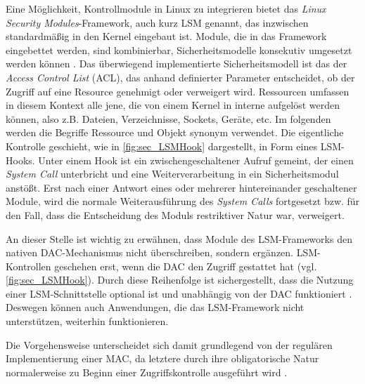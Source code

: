 \documentclass[../main.tex]{subfiles}
\begin{document}
			Eine Möglichkeit, Kontrollmodule in Linux zu integrieren bietet das \emph{Linux Security Modules}-Framework, auch kurz \acrshort{LSM} genannt, das inzwischen standardmäßig in den Kernel eingebaut ist.
			Module, die in das Framework eingebettet werden, sind kombinierbar, Sicherheitsmodelle konsekutiv umgesetzt werden können \cite[S.3]{LSMFramework}.
			Das überwiegend implementierte Sicherheitsmodell ist das der \emph{Access Control List} (\acrshort{ACL}), das anhand definierter Parameter entscheidet, ob der Zugriff auf eine Resource genehmigt oder verweigert wird. Ressourcen umfassen in diesem Kontext alle jene, die von einem Kernel in interne  aufgelöst werden können, also z.B. Dateien, Verzeichnisse, Sockets, Geräte, etc. Im folgenden werden die Begriffe Ressource und Objekt synonym verwendet.
			Die eigentliche Kontrolle geschieht, wie in \fig \ref{fig:sec_LSMHook} dargestellt, in Form eines LSM-Hooks. Unter einem Hook ist ein zwischengeschaltener Aufruf gemeint, der einen \emph{System Call} unterbricht und eine Weiterverarbeitung in ein Sicherheitsmodul anstößt. Erst nach einer Antwort eines oder mehrerer hintereinander geschaltener Module, wird die normale Weiterausführung des \emph{System Calls} fortgesetzt bzw. für den Fall, dass die Entscheidung des Moduls restriktiver Natur war, verweigert.

			An dieser Stelle ist wichtig zu erwähnen, dass Module des LSM-Frameworks den nativen DAC-Mechanismus nicht überschreiben, sondern ergänzen. LSM-Kontrollen geschehen erst, wenn die DAC den Zugriff gestattet hat (vgl. \fig \ref{fig:sec_LSMHook}). Durch diese Reihenfolge ist sichergestellt, dass die Nutzung einer LSM-Schnittstelle optional ist und unabhängig von der DAC funktioniert \cite{centOsMCS}. Deswegen können auch Anwendungen, die das LSM-Framework nicht unterstützen, weiterhin funktionieren.

			Die Vorgehensweise unterscheidet sich damit grundlegend von der regulären Implementierung einer MAC, da letztere durch ihre obligatorische Natur normalerweise zu Beginn einer Zugriffskontrolle ausgeführt wird \cite[S.3]{LSMFramework}.
\end{document}
